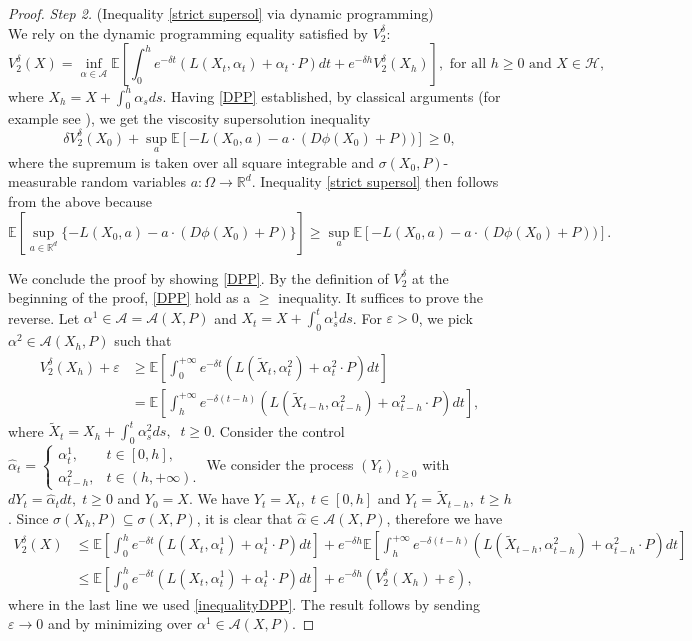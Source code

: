 \documentclass[reqno,11pt]{amsart}
\numberwithin{equation}{section}
\newcommand{\be}{\begin{equation}}
\newcommand{\ee}{\end{equation}}
\newcommand{\R}{\mathbb{R}} %
\newcommand{\e}{\varepsilon}
\newcommand{\nd}{\noindent}
\renewcommand{\hat}{\widehat}
\begin{document}
\begin{proof}
    \nd
    \textit{Step 2.} (Inequality \eqref{strict supersol} via dynamic programming)\\
    We rely on the dynamic programming equality satisfied by $V_2^\delta$:
    \be\label{DPP}
V_2^\delta(X)=\inf_{\alpha\in \mathcal{A}}\mathbb{E}\left[ \int_0^he^{-\delta t}(L(X_t,\alpha_t)+\alpha_t\cdot P)dt+e^{-\delta h}V_2^\delta(X_h)\right], \text{ for all }h\ge 0\text{ and }X\in\mathcal{H},
    \ee
    where $X_h=X+\int_0^h\alpha_sds$. Having \eqref{DPP} established, by classical arguments (for example see \cite[Section 2.5]{fabbri2017stochastic}), we get the viscosity supersolution inequality
    $$\delta V^\delta_2(X_0)+\sup_{a}\mathbb{E}[-L(X_0,a)-a\cdot(D\phi(X_0)+P))]\ge 0,$$
    where the supremum is taken over all square integrable and $\sigma(X_0,P)$-measurable random variables $a\colon \Omega\to\R^d$. Inequality \eqref{strict supersol} then follows from the above because
    $$\mathbb{E}[\sup_{a\in \R^d}\{-L(X_0,a)-a\cdot (D\phi(X_0)+P)\}]\ge \sup_{a}\mathbb{E}[-L(X_0,a)-a\cdot(D\phi(X_0)+P))].$$
    \vspace{0.5mm}

    \nd
    We conclude the proof by showing \eqref{DPP}. By the definition of $V_2^\delta$ at the beginning of the proof, \eqref{DPP} hold as a $\ge$ inequality. It suffices to prove the reverse. Let $\alpha^1\in\mathcal{A}=\mathcal{A}(X,P)$ and $X_t=X+\int_0^t\alpha_s^1ds$. For $\e>0$, we pick $\alpha^2\in\mathcal{A}(X_h,P)$ such that
    \begin{align}
        V_2^\delta(X_h)+\e&\ge \mathbb{E}\left[\int_0^{+\infty}e^{-\delta t}(L(\widetilde{X}_t,\alpha_t^2)+\alpha^2_t\cdot P)dt     \right]\nonumber\\
        &=\mathbb{E}\left[\int_h^{+\infty}e^{-\delta (t-h)}(L(\widetilde{X}_{t-h},\alpha_{t-h}^2)+\alpha^2_{t-h}\cdot P)dt \right],\label{inequalityDPP}
    \end{align}
    where $\widetilde{X}_t=X_h+\int_0^t\alpha^2_sds,\;\;t\ge 0$. Consider the control $\hat{\alpha}_t=\begin{cases}
        \alpha^1_t,&t\in [0,h],\\
        \alpha^2_{t-h},& t\in (h,+\infty).
    \end{cases}$ We consider the process $(Y_t)_{t\ge 0}$ with $dY_t=\hat{\alpha}_tdt,\;t\ge 0$ and $Y_0=X$. We have $Y_t=X_t,\;t\in [0,h]$ and $Y_t=\widetilde{X}_{t-h},\; t\ge h$. Since $\sigma(X_h,P)\subseteq \sigma(X,P)$, it is clear that $\hat{\alpha}\in \mathcal{A}(X,P)$, therefore we have
    \begin{align*}
        V_2^\delta(X)&\le \mathbb{E}\left[\int_0^{h}e^{-\delta t}(L(X_t,\alpha_t^1)+\alpha^1_t\cdot P)dt\right]+e^{-\delta h}\mathbb{E}\left[\int_h^{+\infty}e^{-\delta (t-h)}(L(\widetilde{X}_{t-h},\alpha_{t-h}^2)+\alpha^2_{t-h}\cdot P)dt \right]\\
        &\le \mathbb{E}\left[\int_0^{h}e^{-\delta t}(L(X_t,\alpha_t^1)+\alpha^1_t\cdot P)dt\right]+e^{-\delta h}\left( V_2^\delta(X_h)+\e\right),
    \end{align*}
    where in the last line we used \eqref{inequalityDPP}. The result follows by sending $\e\to 0$ and by minimizing over $\alpha^1\in\mathcal{A}(X,P)$.
\end{proof}
\end{document}
